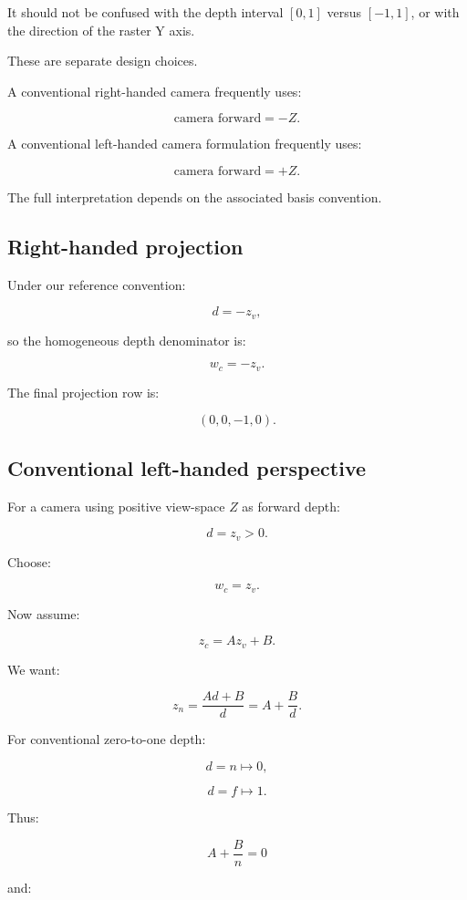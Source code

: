 It should not be confused with the depth interval \([0,1]\) versus \([-1,1]\), or with the direction of the raster Y axis.

These are separate design choices.

A conventional right-handed camera frequently uses:

\[
 \boxed{ \text{camera forward}=-Z }.
\]

A conventional left-handed camera formulation frequently uses:

\[
 \boxed{ \text{camera forward}=+Z }.
\]

The full interpretation depends on the associated basis convention.

\subsection{Right-handed projection}\label{02-foundations-ii-ch033-right-handed-projection}

Under our reference convention:

\[
 d=-z_v,
\]

so the homogeneous depth denominator is:

\[
 \boxed{w_c=-z_v}.
\]

The final projection row is:

\[
 \boxed{ (0,0,-1,0) }.
\]

\subsection{Conventional left-handed perspective}\label{02-foundations-ii-ch033-conventional-left-handed-perspective}

For a camera using positive view-space \(Z\) as forward depth:

\[
 d=z_v>0.
\]

Choose:

\[
 \boxed{w_c=z_v}.
\]

Now assume:

\[
 z_c=Az_v+B.
\]

We want:

\[
 z_n=\frac{Ad+B}{d} =A+\frac Bd.
\]

For conventional zero-to-one depth:

\[
 d=n\mapsto0,
\]

\[
 d=f\mapsto1.
\]

Thus:

\[
 A+\frac Bn=0
\]

and:


